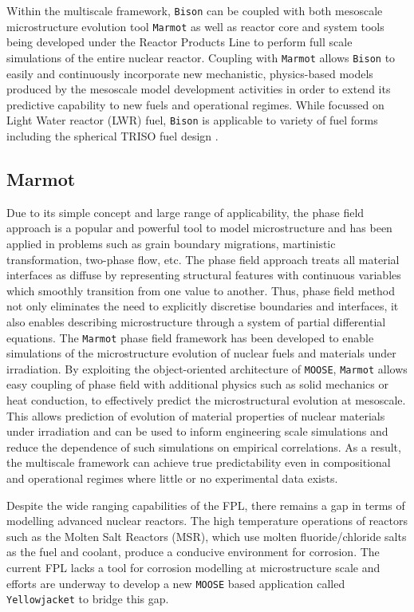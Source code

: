 	Within the multiscale framework, \texttt{Bison} can be coupled with both mesoscale microstructure evolution tool \texttt{Marmot} as well as reactor core and system tools being developed under the Reactor Products Line to perform full scale simulations of the entire nuclear reactor. Coupling with \texttt{Marmot} allows \texttt{Bison} to easily and continuously incorporate new mechanistic, physics-based models produced by the mesoscale model development activities in order to extend its predictive capability to new fuels and operational regimes. While focussed on Light Water reactor (LWR) fuel, \texttt{Bison} is applicable to variety of fuel forms including the spherical TRISO fuel design \cite{NEAMS}. 
	
	\subsection{Marmot}
	Due to its simple concept and large range of applicability, the phase field approach is a popular and powerful tool to model microstructure and has been applied in problems such as grain boundary migrations, martinistic transformation, two-phase flow, etc. The phase field approach treats all material interfaces as diffuse by representing structural features with continuous variables which smoothly transition from one value to another. Thus, phase field method not only eliminates the need to explicitly discretise boundaries and interfaces, it also enables describing microstructure through a system of partial differential equations.  The \texttt{Marmot} phase field framework has been developed to enable simulations of the microstructure evolution of nuclear fuels and materials under irradiation. By exploiting the object-oriented architecture of \texttt{MOOSE}, \texttt{Marmot} allows easy coupling of phase field with additional physics such as solid mechanics or heat conduction, to effectively predict the microstructural evolution at mesoscale. This allows prediction of evolution of material properties of nuclear materials under irradiation and can be used to inform engineering scale simulations and reduce the dependence of such simulations on empirical correlations. As a result, the multiscale framework can achieve true predictability even in compositional and operational regimes where little or no experimental data exists.
	
	Despite the wide ranging capabilities of the FPL, there remains a gap in terms of modelling advanced nuclear reactors. The high temperature operations of reactors such as the Molten Salt Reactors (MSR), which use molten fluoride/chloride salts as the fuel and coolant, produce a conducive environment for corrosion. The current FPL lacks a tool for corrosion modelling at microstructure scale and efforts are underway to develop a new \texttt{MOOSE} based application called \texttt{Yellowjacket} to bridge this gap. 

